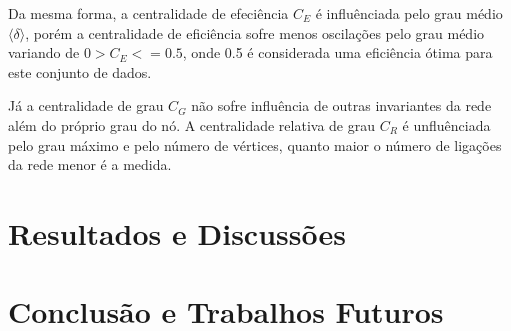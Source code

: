 \documentclass[12pt]{article}
\begin{document}
Da mesma forma, a centralidade de efeciência $C_E$ é influênciada pelo grau médio $\langle \delta \rangle$, porém a centralidade de eficiência sofre menos oscilações pelo grau médio variando de $0>C_E<=0.5$, onde 0.5 é considerada uma eficiência ótima para este conjunto de dados.

Já a centralidade de grau $C_G$ não sofre influência de outras invariantes da rede além do próprio grau do nó. 
A centralidade relativa de grau $C_R$ é unfluênciada pelo grau máximo e pelo número de vértices, quanto maior o número de ligações da rede menor é a medida.




\section{Resultados e Discussões}\label{sec:result}


\section{Conclusão e Trabalhos Futuros}\label{sec:conc}



\end{document}
